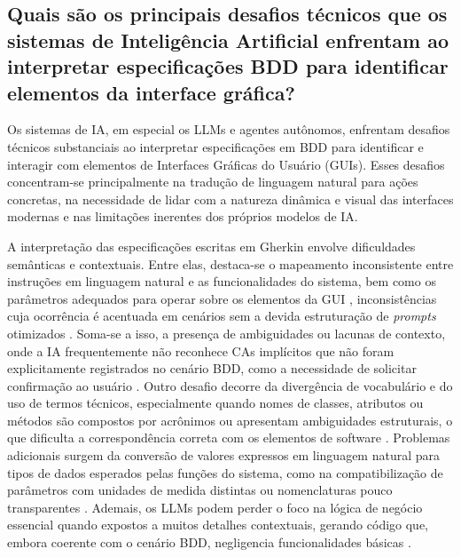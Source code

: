 \subsection{Quais são os principais desafios técnicos que os sistemas de Inteligência Artificial enfrentam ao interpretar especificações BDD para identificar elementos da interface gráfica?}

Os sistemas de IA, em especial os LLMs e agentes autônomos, enfrentam desafios técnicos substanciais ao interpretar especificações em BDD para identificar e interagir com elementos de Interfaces Gráficas do Usuário (GUIs). Esses desafios concentram-se principalmente na tradução de linguagem natural para ações concretas, na necessidade de lidar com a natureza dinâmica e visual das interfaces modernas e nas limitações inerentes dos próprios modelos de IA. 

A interpretação das especificações escritas em Gherkin envolve dificuldades semânticas e contextuais. Entre elas, destaca-se o mapeamento inconsistente entre instruções em linguagem natural e as funcionalidades do sistema, bem como os parâmetros adequados para operar sobre os elementos da GUI \cite{Paduraru2025}, inconsistências cuja ocorrência é acentuada em cenários sem a devida estruturação de \textit{prompts} otimizados \cite{Pysmennyi2025}. Soma-se a isso, a presença de ambiguidades ou lacunas de contexto, onde a IA frequentemente não reconhece CAs implícitos que não foram explicitamente registrados no cenário BDD, como a necessidade de solicitar confirmação ao usuário \cite{Zhang2025}. Outro desafio decorre da divergência de vocabulário e do uso de termos técnicos, especialmente quando nomes de classes, atributos ou métodos são compostos por acrônimos ou apresentam ambiguidades estruturais, o que dificulta a correspondência correta com os elementos de software \cite{Wang2022}. Problemas adicionais surgem da conversão de valores expressos em linguagem natural para tipos de dados esperados pelas funções do sistema, como na compatibilização de parâmetros com unidades de medida distintas ou nomenclaturas pouco transparentes \cite{Paduraru2025}. Ademais, os LLMs podem perder o foco na lógica de negócio essencial quando expostos a muitos detalhes contextuais, gerando código que, embora coerente com o cenário BDD, negligencia funcionalidades básicas \cite{Zhang2025}.

